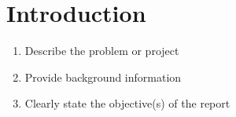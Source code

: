 \section{Introduction}

\begin{enumerate}
    \item Describe the problem or project
    \item Provide background information
    \item Clearly state the objective(s) of the report
\end{enumerate}